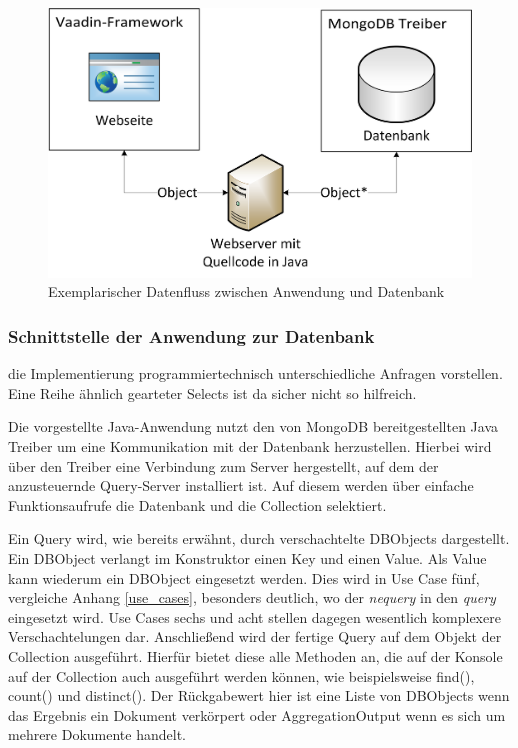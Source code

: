 \begin{figure}[H]
    \centering
    \includegraphics[scale=0.6]{images/01_datenfluss.png}
    \caption{Exemplarischer Datenfluss zwischen Anwendung und Datenbank}\label{fig:datenfluss}
\end{figure}

\subsubsection{Schnittstelle der Anwendung zur Datenbank} \label{dbdriver}

die Implementierung programmiertechnisch unterschiedliche Anfragen vorstellen.
Eine Reihe ähnlich gearteter Selects ist da sicher nicht so hilfreich.


Die vorgestellte Java-Anwendung nutzt den von MongoDB bereitgestellten Java Treiber um eine Kommunikation mit der Datenbank herzustellen. Hierbei wird über den Treiber eine Verbindung zum Server hergestellt, auf dem der anzusteuernde Query-Server installiert ist. Auf diesem werden über einfache Funktionsaufrufe die Datenbank und die Collection selektiert. 

Ein Query wird, wie bereits erwähnt, durch verschachtelte DBObjects dargestellt. Ein DBObject verlangt im Konstruktor einen Key und einen Value. Als Value kann wiederum ein DBObject eingesetzt werden. Dies wird in Use Case fünf, vergleiche Anhang \ref{use_cases}, besonders deutlich, wo der \textit{nequery} in den \textit{query} eingesetzt wird. Use Cases sechs und acht stellen dagegen wesentlich komplexere Verschachtelungen dar. 
Anschließend wird der fertige Query auf dem Objekt der Collection ausgeführt. Hierfür bietet diese alle Methoden an, die auf der Konsole auf der Collection auch ausgeführt werden können, wie beispielsweise find(), count() und distinct(). Der Rückgabewert hier ist eine Liste von DBObjects wenn das Ergebnis ein Dokument verkörpert oder AggregationOutput wenn es sich um mehrere Dokumente handelt.

